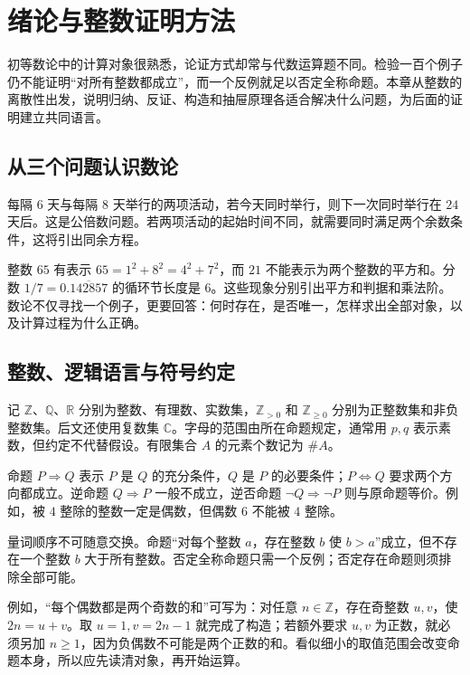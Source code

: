 \documentclass[UTF8,12pt,a4paper,fontset=fandol]{ctexbook}
\begin{document}
\chapter{绪论与整数证明方法}
\label{ch:introduction}

初等数论中的计算对象很熟悉，论证方式却常与代数运算题不同。检验一百个例子仍不能证明“对所有整数都成立”，而一个反例就足以否定全称命题。本章从整数的离散性出发，说明归纳、反证、构造和抽屉原理各适合解决什么问题，为后面的证明建立共同语言。

\section{从三个问题认识数论}
\label{sec:intro-questions}

每隔 $6$ 天与每隔 $8$ 天举行的两项活动，若今天同时举行，则下一次同时举行在 $24$ 天后。这是公倍数问题。若两项活动的起始时间不同，就需要同时满足两个余数条件，这将引出同余方程。

整数 $65$ 有表示 $65=1^2+8^2=4^2+7^2$，而 $21$ 不能表示为两个整数的平方和。分数 $1/7=0.\overline{142857}$ 的循环节长度是 $6$。这些现象分别引出平方和判据和乘法阶。数论不仅寻找一个例子，更要回答：何时存在，是否唯一，怎样求出全部对象，以及计算过程为什么正确。

\section{整数、逻辑语言与符号约定}

记 $\mathbb Z$、$\mathbb Q$、$\mathbb R$ 分别为整数、有理数、实数集，$\mathbb Z_{>0}$ 和 $\mathbb Z_{\ge0}$ 分别为正整数集和非负整数集。后文还使用复数集 $\mathbb C$。字母的范围由所在命题规定，通常用 $p,q$ 表示素数，但约定不代替假设。有限集合 $A$ 的元素个数记为 $\#A$。

命题 $P\Rightarrow Q$ 表示 $P$ 是 $Q$ 的充分条件，$Q$ 是 $P$ 的必要条件；$P\Leftrightarrow Q$ 要求两个方向都成立。逆命题 $Q\Rightarrow P$ 一般不成立，逆否命题 $\neg Q\Rightarrow\neg P$ 则与原命题等价。例如，被 $4$ 整除的整数一定是偶数，但偶数 $6$ 不能被 $4$ 整除。

量词顺序不可随意交换。命题“对每个整数 $a$，存在整数 $b$ 使 $b>a$”成立，但不存在一个整数 $b$ 大于所有整数。否定全称命题只需一个反例；否定存在命题则须排除全部可能。

例如，“每个偶数都是两个奇数的和”可写为：对任意 $n\in\mathbb Z$，存在奇整数 $u,v$，使 $2n=u+v$。取 $u=1,v=2n-1$ 就完成了构造；若额外要求 $u,v$ 为正数，就必须另加 $n\ge1$，因为负偶数不可能是两个正数的和。看似细小的取值范围会改变命题本身，所以应先读清对象，再开始运算。
\end{document}
